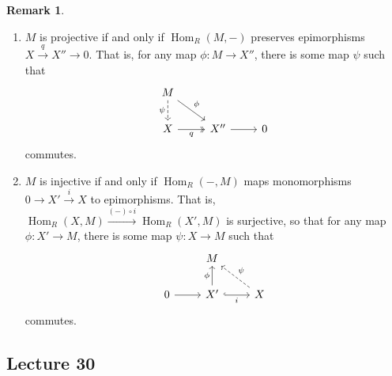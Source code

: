 \documentclass[10pt,letterpaper,cm]{nupset}
\theoremstyle{definition}
\newtheorem{remark}{Remark}
\newcommand{\1}{\mathbf{1}}
\newcommand{\0}{\vec 0}
\DeclareMathOperator{\Hom}{Hom}
\begin{document}
\begin{remark} $ $
\begin{enumerate}
\item $M$ is projective  if and only if $\Hom_R(M, -)$ preserves epimorphisms $X \overset{q}{\longrightarrow}  X'' \to 0$. That is, for any map $\phi : M \to X''$, there is some map $\psi$ such that
\[
\begin{tikzcd}
M \arrow[rd, "\phi"] \arrow[d, "\psi"', dashed] &  &  \\
X \arrow[r, "q"', two heads] & X'' \arrow[r] & 0
\end{tikzcd}
\] commutes.
\item $M$ is injective  if and only if $\Hom_R(-, M)$ maps monomorphisms $0\to X' \overset{i}{\longrightarrow} X$ to epimorphisms. That is, $\Hom_R(X, M) \overset{(-) \circ i}{\longrightarrow} \Hom_R(X', M)$ is surjective, so that for any map $\phi : X' \to M$, there is some map $\psi : X \to M$ such that 
\[
\begin{tikzcd}
 & M &  \\
0 \arrow[r] & X' \arrow[r, "i"', hook] \arrow[u, "\phi"] & X \arrow[lu, "\psi"', dashed]
\end{tikzcd}
\] commutes.
\end{enumerate}
\end{remark}

\subsection{Lecture 30}
\end{document}
